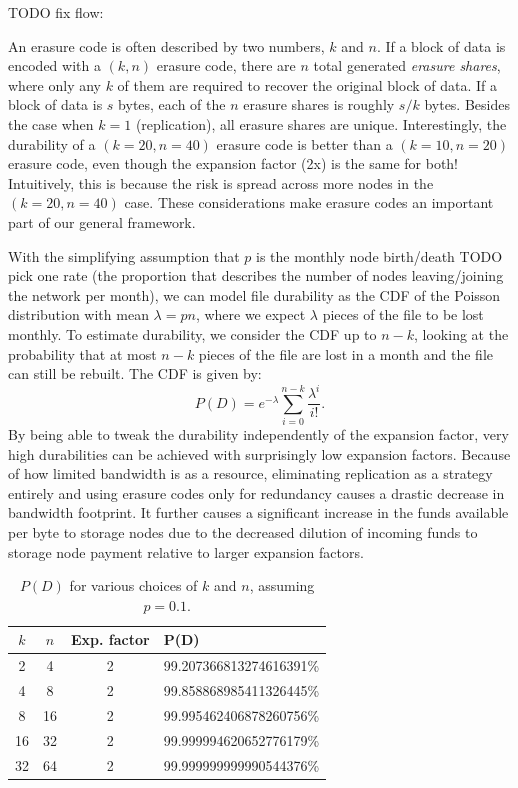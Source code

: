 \documentclass[a4paper,10pt]{article} \usepackage[utf8]{inputenc}
\newcommand{\todo}[1]{{\color{red} TODO #1 }}
\begin{document}
\todo{fix flow:

An erasure code is often described by two numbers, $k$ and $n$. If a block of
data is encoded with a $(k,n)$ erasure code, there are $n$ total generated {\em
erasure shares}, where only any $k$ of them are required to recover the original
block of data. If a block of data is $s$ bytes, each of the $n$ erasure shares
is roughly $s/k$ bytes. Besides the case when $k=1$ (replication), all erasure
shares are unique. Interestingly, the durability of a $(k=20,n=40)$ erasure code
is better than a $(k=10,n=20)$ erasure code, even though the expansion factor
(2x) is the same for both! Intuitively, this is because the risk is spread
across more nodes in the $(k=20,n=40)$ case. These considerations make erasure
codes an important part of our general framework.

With the simplifying assumption that $p$ is the monthly node
birth/death \todo{pick one} rate (the proportion that describes the number of
nodes
leaving/joining the network per month), we can model file durability
as the CDF of the Poisson distribution with mean $\lambda=pn$,
where we expect $\lambda$ pieces of the file to be lost monthly. To estimate
durability, we consider the CDF up to $n-k$,
looking at the probability that at most $n-k$ pieces
of the file are lost in a month and the file can still be rebuilt.
The CDF is given by:
\begin{equation}
P(D) = e^{-\lambda} \sum_{i=0}^{n-k} \frac{\lambda^i}{i!}.
\label{eq:poiss_cdf}
\end{equation}
By being able to tweak the durability independently of the expansion factor,
very high durabilities can be achieved with surprisingly low expansion factors.
Because of how limited bandwidth is as a resource, eliminating replication as a
strategy entirely and using erasure codes only for redundancy causes a drastic
decrease in bandwidth footprint.
It further causes a significant increase in the funds available per byte to
storage nodes due to the decreased dilution of incoming funds to storage node
payment relative to larger expansion factors.

\begin{table}[h]
\centering
\begin{tabular}{c c c l}
$k$ & $n$ & Exp. factor & P(D) \\
\hline 2 & 4 & 2 & 99.207366813274616391\%\\
4 & 8 & 2 & 99.858868985411326445\%\\
8 & 16 & 2 & 99.995462406878260756\%\\
16 & 32 & 2 & 99.999994620652776179\%\\
32 & 64 & 2 & 99.999999999990544376\%\\
\end{tabular}
\caption{$P(D)$ for various choices of $k$ and $n$, assuming $p=0.1$.}
\end{table}

}
\end{document}
